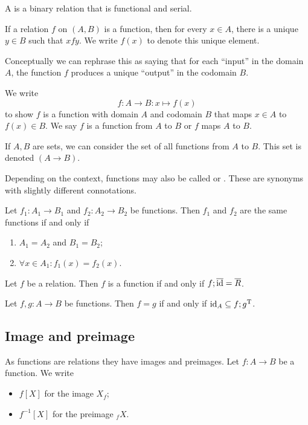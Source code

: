 \begin{definition}
A  is a binary relation that is functional and serial.
\end{definition}
If a relation $f$ on $(A, B)$ is a function, then for every $x\in A$, there is a unique $y\in B$ such that $xfy$. We write $f(x)$ to denote this unique element.

Conceptually we can rephrase this as saying that for each ``input'' in the domain $A$, the function $f$ produces a unique ``output'' in the codomain $B$.

\begin{note}
We write
\[f:A \to B: x\mapsto f(x) \]
to show $f$ is a function with domain $A$ and codomain $B$ that maps $x\in A$ to $f(x)\in B$. We say $f$ is a function from $A$ to $B$ or $f$ maps $A$ to $B$. 

If $A, B$ are sets, we can consider the  set of all functions from $A$ to $B$. This set is denoted $(A\to B)$.
\end{note}

Depending on the context, functions may also be called  or . These are synonyms with slightly different connotations.

\begin{lemma}
Let $f_1: A_1\to B_1$ and $f_2: A_2\to B_2$ be functions. Then $f_1$ and $f_2$ are the same functions \textup{if and only if}
\begin{enumerate}
\item $A_1 = A_2$ and $B_1 = B_2$;
\item $\forall x\in A_1: f_1(x) = f_2(x)$.
\end{enumerate}
\end{lemma}

\begin{lemma}
Let $f$ be a relation. Then $f$ is a function \textup{if and only if} $f;\overline{\operatorname{id}} = \overline{R}$.
\end{lemma}

\begin{lemma} \label{functionEqualityIdComparison}
Let $f,g: A\to B$ be functions. Then $f = g$ \textup{if and only if} $\operatorname{id}_A \subseteq f;g^{\mathrm{T}}$.
\end{lemma}

\subsection{Image and preimage}
As functions are relations they have images and preimages. Let $f:A\to B$ be a function. We write
\begin{itemize}
\item $f[X]$ for the image $X_f$;
\item $f^{-1}[X]$ for the preimage $_fX$.
\end{itemize}

